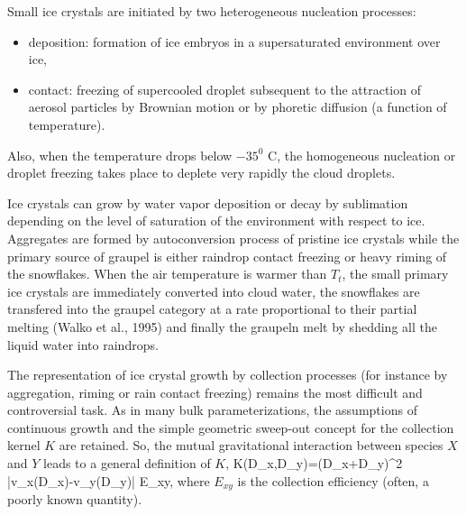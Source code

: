 Small ice crystals are initiated by two heterogeneous nucleation processes:
\begin{itemize}
\item deposition: formation of ice embryos in a supersaturated environment over
ice,
\item contact: freezing of supercooled droplet subsequent to the attraction of
aerosol particles by Brownian motion or by phoretic diffusion (a function of
temperature).
\end{itemize}

Also, when the temperature drops below $-35^0$ C, the homogeneous nucleation or
droplet freezing takes place to deplete very rapidly the cloud droplets.

Ice crystals can grow by water vapor deposition or decay by sublimation
depending on the level of saturation of the environment with respect to ice.
Aggregates are formed by autoconversion process of pristine ice crystals while
the primary source of graupel is either raindrop contact freezing or heavy
riming of the snowflakes. When the air temperature is warmer than $T_t$, the
small primary ice crystals are immediately converted into cloud water, the
snowflakes are transfered into the graupel category at a rate proportional to
their partial melting (Walko et al., 1995) and finally the graupeln melt by
shedding all the liquid water into raindrops.

The representation of ice crystal growth by collection processes (for instance
by aggregation, riming or rain contact freezing) remains the most difficult and
controversial task. As in many bulk parameterizations, the assumptions of
continuous growth and the simple geometric sweep-out concept for the collection kernel $K$ are retained. So, the mutual gravitational interaction between
species $X$ and $Y$ leads to a general definition of $K$,
%
\be\label{ACC1}
K(D_x,D_y)=(D_x+D_y)^2 |v_x(D_x)-v_y(D_y)| E_{xy},
\ee
%
\noindent where $E_{xy}$ is the collection efficiency (often, a poorly known
quantity).

